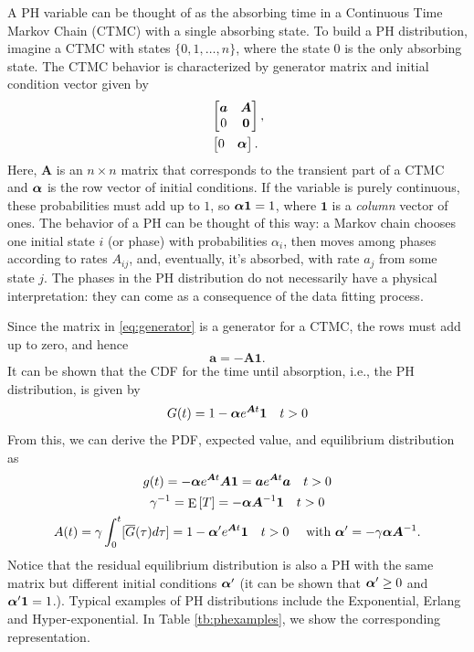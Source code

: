 \documentclass[USenglish,10pt]{article}
\newcommand{\ie}{i.e.\xspace}
\newcommand{\Gb}{\overline{G}\xspace}
\newcommand{\bA}{\ensuremath{\bm A}\xspace}
\newcommand{\bal}{\ensuremath\bm{\alpha}\xspace}
\newcommand{\ba}{\ensuremath{\bm a}\xspace}
\newcommand{\one}{\ensuremath{\bm 1}\xspace}
\DeclareMathOperator{\Exp}{E}       %
\newcommand{\E}[1]{\Exp\left[{#1}\right]}       %
\begin{document}
A PH variable can be thought of as the absorbing time in a Continuous Time Markov Chain (CTMC) with a single absorbing state.
To build a PH distribution, imagine a CTMC with states $\{0,1,\ldots,n\}$, where the state $0$ is the only absorbing state.
The CTMC behavior is characterized by generator matrix and initial condition vector given by
\begin{align}
	&\begin{bmatrix}
		\ba  & \bA \\
		0    & {\bm{0}}
	\end{bmatrix}, 	\label{eq:generator}\\
	&\begin{bmatrix}
		 0 & \bal
	\end{bmatrix}.
\end{align}
Here, $\bA$ is an $n\times n$ matrix that corresponds to the transient part of a CTMC and $\bal$ is the row vector of initial conditions.
If the variable is purely continuous, these probabilities must add up to $1$, so $\bal\one=1$, where $\one$ is a \emph{column} vector of ones.
The behavior of a PH can be thought of this way: a Markov chain chooses one initial state $i$ (or phase) with probabilities $\alpha_i$,  then moves among phases according to rates $A_{ij}$, and, eventually, it's absorbed, with rate $a_j$ from some state $j$. The phases in the PH distribution do not necessarily have a physical interpretation: they can come as a consequence of the data fitting process.

Since the matrix in \eqref{eq:generator} is a generator for a CTMC, the rows must add up to zero, and hence
\begin{equation}\label{eq:sumA}
	\ba = -\bA\one.
\end{equation}
It can be shown that the CDF for the time until absorption, \ie, the PH distribution, is given by
\begin{equation*}
G(t) = 1 - \bal e^{\bA t} \one \quad t>0
\end{equation*}
From this, we can derive the PDF, expected value, and equilibrium distribution as
\begin{gather}
g(t) =  -\bal e^{\bA t} \bA\one=\ba e^{\bA t} \ba \quad t>0 \\
\gamma^{-1} = \E{T} = - \bal \bA^{-1} \one \quad t>0 \\
A(t) =\gamma \int_0^t[\Gb(\tau)d\tau] = 1 - \bal'e^{\bA t} \one  \quad t>0
      \quad  \text{ with }  \bal'=-\gamma\bal \bA^{-1}.
\end{gather}
Notice that the residual equilibrium distribution is also a PH with the same matrix but different initial conditions $\bal'$ (it can be shown that $\bal'\geq 0$ and $\bal'\one=1$.). Typical examples of PH distributions include the Exponential, Erlang and Hyper-exponential. In Table \ref{tb:phexamples}, we show the corresponding representation.
\end{document}
